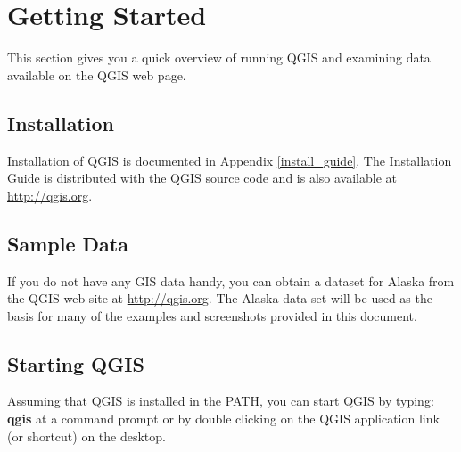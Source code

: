 \chapter{Getting Started}

This section gives you a quick overview of running QGIS and examining
data available on the QGIS web page.



\section{Installation}
Installation of QGIS is documented in Appendix \ref{install_guide}. The Installation Guide is distributed with the QGIS source code and is also available at \url{http://qgis.org}.


\section{Sample Data}
If you do not have any GIS data handy, you can obtain a dataset for Alaska from the QGIS web site at \url{http://qgis.org}. The Alaska data set will be used as the basis for many of the examples and screenshots provided in this document.


\section{Starting QGIS}

Assuming that QGIS is installed in the PATH, you can start QGIS by
typing: \textbf{qgis}  at a command prompt or by double clicking on the QGIS application link (or shortcut) on the desktop.
